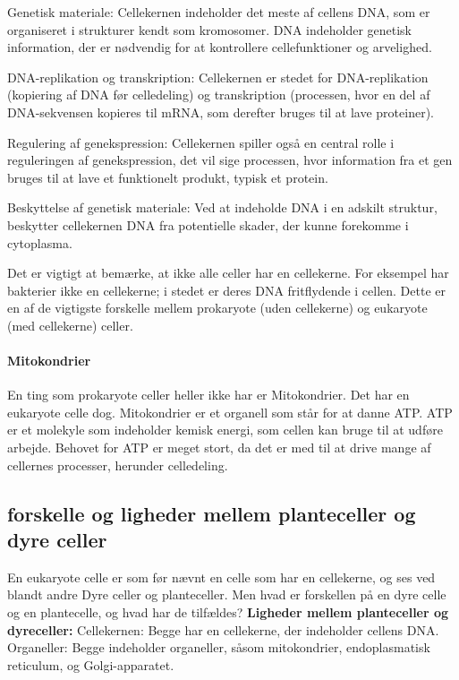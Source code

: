                 Genetisk materiale: Cellekernen indeholder det meste af cellens DNA, som er organiseret i strukturer kendt som kromosomer. DNA indeholder genetisk information, der er nødvendig for at kontrollere cellefunktioner og arvelighed.

                DNA-replikation og transkription: Cellekernen er stedet for DNA-replikation (kopiering af DNA før celledeling) og transkription (processen, hvor en del af DNA-sekvensen kopieres til mRNA, som derefter bruges til at lave proteiner).

                Regulering af genekspression: Cellekernen spiller også en central rolle i reguleringen af genekspression, det vil sige processen, hvor information fra et gen bruges til at lave et funktionelt produkt, typisk et protein.

                Beskyttelse af genetisk materiale: Ved at indeholde DNA i en adskilt struktur, beskytter cellekernen DNA fra potentielle skader, der kunne forekomme i cytoplasma.

                Det er vigtigt at bemærke, at ikke alle celler har en cellekerne. For eksempel har bakterier ikke en cellekerne; i stedet er deres DNA fritflydende i cellen. Dette er en af de vigtigste forskelle mellem prokaryote (uden cellekerne) og eukaryote (med cellekerne) celler.
                
            \paragraph{Mitokondrier}
                En ting som prokaryote celler heller ikke har er Mitokondrier. Det har en eukaryote celle dog. Mitokondrier er et organell som står for at danne ATP.
                ATP er et molekyle som indeholder kemisk energi, som cellen kan bruge til at udføre arbejde. Behovet for ATP er meget stort, da det er med til at drive mange af cellernes processer, herunder celledeling.   
            
        \subsection*{forskelle og ligheder mellem planteceller og dyre celler}
            En eukaryote celle er som før nævnt en celle som har en cellekerne, og ses ved blandt andre Dyre celler og planteceller. Men hvad er forskellen på en dyre celle og en plantecelle, og hvad har de tilfældes?
            \newline\textbf{Ligheder mellem planteceller og dyreceller:}\newline
            Cellekernen: Begge har en cellekerne, der indeholder cellens DNA.
            Organeller: Begge indeholder organeller, såsom mitokondrier, endoplasmatisk reticulum, og Golgi-apparatet.

